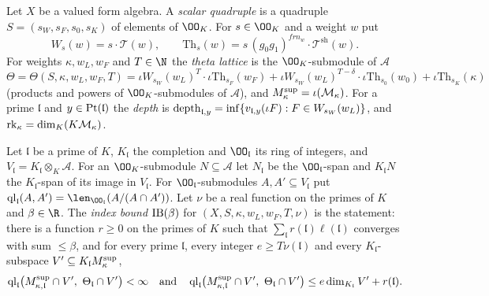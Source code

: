 \begin{definition}\label{pf:onto1:theta}
Let $X$ be a valued form algebra. A \emph{scalar quadruple} is a quadruple $S=(s_W,s_F,s_0,s_K)$ of elements
of $\OO_K$. For $s\in\OO_K$ and a weight $w$ put
\[
W_s(w)=s\cdot\mathcal T(w),\qquad \mathrm{Th}_s(w)=s\,(g_0g_1)^{frn_w}\cdot\mathcal T^{\mathrm{sh}}(w).
\]
For weights $\kappa,w_L,w_F$ and $T\in\N$ the \emph{theta lattice} is the $\OO_K$-submodule of $\mathcal A$
\[
\Theta=\Theta(S,\kappa,w_L,w_F,T)=\iota W_{s_W}(w_L)^{T}\cdot\iota\mathrm{Th}_{s_F}(w_F)
+\iota W_{s_W}(w_L)^{T-\delta}\cdot\iota\mathrm{Th}_{s_0}(w_0)+\iota\mathrm{Th}_{s_K}(\kappa)
\]
(products and powers of $\OO_K$-submodules of $\mathcal A$), and $M^{\mathrm{sup}}_\kappa=\iota(\mathcal M_\kappa)$. For a prime
$\mathfrak l$ and $y\in\operatorname{Pt}(\mathfrak l)$ the \emph{depth} is $\operatorname{depth}_{\mathfrak l,y}=\inf\{v_{\mathfrak
l,y}(\iota F):F\in W_{s_W}(w_L)\}$, and $\operatorname{rk}_\kappa=\dim_K(K\mathcal M_\kappa)$.
\end{definition}

\begin{definition}\label{pf:onto1:concl}
Let $\mathfrak l$ be a prime of $K$, $K_{\mathfrak l}$ the completion and $\OO_{\mathfrak l}$ its ring of integers,
and $V_{\mathfrak l}=K_{\mathfrak l}\otimes_K\mathcal A$. For an $\OO_K$-submodule $N\subseteq\mathcal A$ let
$N_{\mathfrak l}$ be the $\OO_{\mathfrak l}$-span and $K_{\mathfrak l}N$ the $K_{\mathfrak l}$-span of its image in
$V_{\mathfrak l}$. For $\OO_{\mathfrak l}$-submodules $A,A'\subseteq V_{\mathfrak l}$ put $\ontooneql_{\mathfrak l}(A,A')=
\len_{\OO_{\mathfrak l}}(A/(A\cap A'))$. Let $\nu$ be a real function on the primes of $K$ and $\beta\in\R$. The
\emph{index bound} $\mathrm{IB}(\beta)$ for $(X,S,\kappa,w_L,w_F,T,\nu)$ is the statement: there is a function
$r\ge0$ on the primes of $K$ such that $\sum_{\mathfrak l}r(\mathfrak l)\ell(\mathfrak l)$ converges with sum $\le\beta$,
and for every prime $\mathfrak l$, every integer $e\ge T\nu(\mathfrak l)$ and every $K_{\mathfrak l}$-subspace
$V'\subseteq K_{\mathfrak l}M^{\mathrm{sup}}_\kappa$,
\[
\ontooneql_{\mathfrak l}\bigl(\ontooneMsup_{\kappa,\mathfrak l}\cap V',\ \Theta_{\mathfrak l}\cap V'\bigr)<\infty
\quad\text{and}\quad
\ontooneql_{\mathfrak l}\bigl(\ontooneMsup_{\kappa,\mathfrak l}\cap V',\ \Theta_{\mathfrak l}\cap V'\bigr)\le
e\dim_{K_{\mathfrak l}}V'+r(\mathfrak l).
\]
\end{definition}

